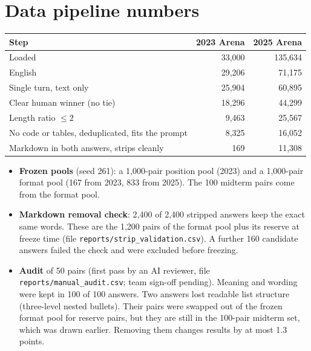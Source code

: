 \documentclass[10.5pt]{article}
\begin{document}
\section{Data pipeline numbers}
\begin{table}[H]
\centering\small
\begin{tabular}{lrr}
\toprule
Step & 2023 Arena & 2025 Arena \\
\midrule
Loaded & 33{,}000 & 135{,}634 \\
English & 29{,}206 & 71{,}175 \\
Single turn, text only & 25{,}904 & 60{,}895 \\
Clear human winner (no tie) & 18{,}296 & 44{,}299 \\
Length ratio $\le 2$ & 9{,}463 & 25{,}567 \\
No code or tables, deduplicated, fits the prompt & 8{,}325 & 16{,}052 \\
Markdown in both answers, strips cleanly & 169 & 11{,}308 \\
\bottomrule
\end{tabular}
\end{table}
\begin{itemize}
\item \textbf{Frozen pools} (seed 261): a 1{,}000-pair position pool (2023) and a 1{,}000-pair format pool (167
from 2023, 833 from 2025). The 100 midterm pairs come from the format pool.
\item \textbf{Markdown removal check}: 2{,}400 of 2{,}400 stripped answers keep the exact same words. These
are the 1{,}200 pairs of the format pool plus its reserve at freeze time (file
\texttt{reports/strip\_validation.csv}). A further 160 candidate answers failed the check and were excluded
before freezing.
\item \textbf{Audit} of 50 pairs (first pass by an AI reviewer, file \texttt{reports/manual\_audit.csv}; team
sign-off pending). Meaning and wording were kept in 100 of 100 answers. Two answers lost readable list structure
(three-level nested bullets). Their pairs were swapped out of the frozen format pool for reserve pairs, but they
are still in the 100-pair midterm set, which was drawn earlier. Removing them changes results by at most 1.3
points.
\end{itemize}
\end{document}
